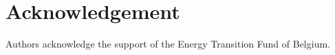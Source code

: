 \documentclass[11pt,twoside,a4paper,english]{article}
\begin{document}
\newpage

\section*{Acknowledgement}
Authors acknowledge the support of the Energy Transition Fund of Belgium.

% 
\printbibliography[heading=bibintoc]
\end{document}
